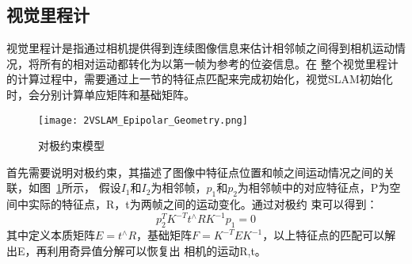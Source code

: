 \subsection{视觉里程计}
视觉里程计是指通过相机提供得到连续图像信息来估计相邻帧之间得到相机运动情况，将所有的相对运动都转化为以第一帧为参考的位姿信息。在
整个视觉里程计的计算过程中，需要通过上一节的特征点匹配来完成初始化，视觉SLAM初始化时，会分别计算单应矩阵和基础矩阵。
\begin{figure}[h] %
  \centering
  \texttt{[image: 2VSLAM\_Epipolar\_Geometry.png]}
  \caption{对极约束模型}
  \label{fig:2VSLAM_Epipolar_Geometry}
\end{figure}
首先需要说明对极约束，其描述了图像中特征点位置和帧之间运动情况之间的关联，如图~\ref{fig:2VSLAM_Epipolar_Geometry}所示，
假设$I_1$和$I_2$为相邻帧，$p_1$和$p_2$为相邻帧中的对应特征点，P为空间中实际的特征点，R，t为两帧之间的运动变化。通过对极约
束可以得到：
\begin{equation}
  p_{2}^{T} K^{-T} t^{\wedge} R K^{-1} p_{1}=0
\end{equation}
其中定义本质矩阵$ E = t^{\wedge} R$，基础矩阵$F =  K^{-T}E K^{-1}$，以上特征点的匹配可以解出E，再利用奇异值分解可以恢复出
相机的运动R,t。

